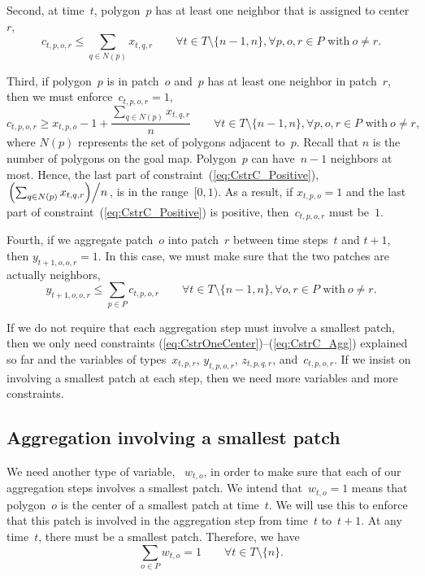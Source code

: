 Second, at time~$t$, polygon~$p$ has at least 
one neighbor that is assigned to center~$r$,
\begin{equation}
\label{eq:CstrC_Neighbor}
c_{t,p,o,r} \le \sum_{q\in N(p)} x_{t,q,r} \qquad
\forall t 	 \in T\setminus \{n-1,n\},  
\forall p, o, r \in P \text{~with}~o\ne r.
\end{equation}

Third, if polygon~$p$ is in patch~$o$ and~$p$ has at least 
one neighbor in patch~$r$, then we must enforce~$c_{t,p,o,r}=1$,
\begin{equation}
\label{eq:CstrC_Positive}
c_{t,p,o,r} \ge x_{t,p,o} -1 +
\frac{\sum_{q\in N(p)} x_{t,q,r}}{n} \qquad
\forall t 	 \in T\setminus \{n-1,n\},  
\forall p, o, r \in P \text{~with}~o\ne r,
\end{equation}
where $N(p)$ represents the set of polygons adjacent to~$p$.
Recall that $n$ is the number of polygons on the goal map.
Polygon~$p$ can have~$n-1$ neighbors at most.
Hence, the last part of constraint~(\ref{eq:CstrC_Positive}),
$\left. \left(\sum_{q\in N(p)} x_{t,q,r}\right) 
\middle/ n \right.$,
is in the range~$[0,1)$.
As a result, if $x_{t,p,o}=1$ and the last part of 
constraint~(\ref{eq:CstrC_Positive}) is positive, 
then~$c_{t,p,o,r}$ must be~$1$.

Fourth, if we aggregate patch~$o$ into patch~$r$
between time steps~$t$ and $t+1$, 
then $y_{t+1,o,o,r}=1$.
In this case, we must make sure that 
the two patches are actually neighbors,
\begin{equation}
\label{eq:CstrC_Agg}
y_{t+1,o,o,r} \le \sum_{p\in P} c_{t,p,o,r} \qquad
\forall t 	 \in T\setminus \{n-1,n\},  
\forall o, r \in P \text{~with}~o\ne r.
\end{equation}


If we do not require that 
each aggregation step must involve a smallest patch,
then we only need constraints
(\ref{eq:CstrOneCenter})--(\ref{eq:CstrC_Agg})
explained so far 
and the variables of 
types~$x_{t,p,r}$, $y_{t,p,o,r}$, $z_{t,p,q,r}$,
and~$c_{t,p,o,r}$.
If we insist on involving a smallest patch at each step,
then we need more variables and more constraints.


\subsection{Aggregation involving a smallest patch}

We need another type of variable, ~$w_{t,o}$, 
in order to make sure that 
each of our aggregation steps involves a smallest patch.
We intend that~$w_{t,o}=1$ means 
that polygon~$o$ is the center of 
a smallest patch at time~$t$.
We will use this to enforce that
this patch is involved in the aggregation step 
from time~$t$ to~$t+1$.
At any time~$t$, there must be a smallest patch.
Therefore, we have
\begin{equation}
\label{eq:CstrSOneSmallest}
\sum_{o\in P}w_{t,o} =1 \qquad 
\forall t \in {T}\setminus \{n\}.
\end{equation}

